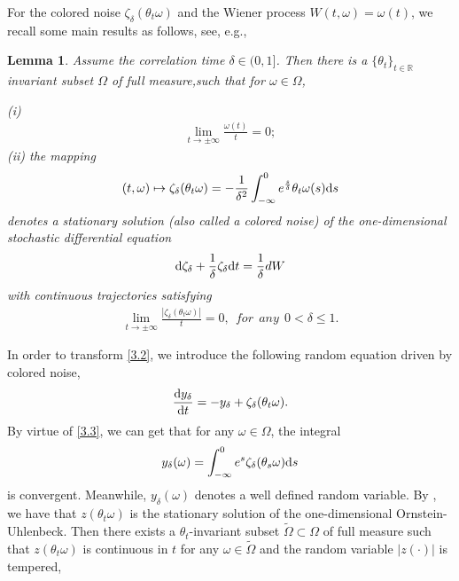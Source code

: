 \documentclass{elsarticle}
\newtheorem{lemma}[theorem]{Lemma}
\theoremstyle{definition}
\numberwithin{equation}{section}
\renewcommand{\d}{{\rm{d}}}
\begin{document}
For the colored noise $\zeta_{\delta}(\theta_t\omega)$ and the Wiener process $W(t,\omega)=\omega(t)$, we recall some main results as follows,  see, e.g., \cite{gu2020,gu2018}
\begin{lemma} \label{lemma3.4}
 Assume the correlation time $\delta\in (0,1]$. Then there is a $\{\theta_t\}_{t\in \mathbb{R}}$ invariant subset $\Omega$ of full measure,such that for $\omega\in\Omega$,

(i)\begin{align*}
\lim\limits_{t\rightarrow\pm\infty}\frac{\omega(t)}{t}=0;
\end{align*}
(ii) the mapping
\begin{align*}
(t,\omega)\mapsto\zeta_{\delta}(\theta_t\omega)=-\frac{1}{\delta^2}\int^0_{-\infty}e^{\frac{s}{\delta}}\theta_t\omega(s)\d s
\end{align*}
denotes a stationary solution (also called  a colored noise) of the one-dimensional stochastic differential equation
\begin{align*}
\d \zeta_{\delta}+\frac{1}{\delta}\zeta_{\delta}\d t= \frac{1}{\delta}dW
\end{align*}
with continuous trajectories satisfying
\begin{align}\label{3.3}
\lim\limits_{t\rightarrow\pm\infty}\frac{|\zeta_{\delta}(\theta_t\omega)|}{t}=0,~~for~~any~~0<\delta\leq1.
\end{align}
\end{lemma}
 In order to transform \eqref{3.2},   we introduce the following random equation driven by colored noise,
  \begin{align}\label{3.8}
\frac{\d y_{\delta}}{\d t}=- y_{\delta}+\zeta_{\delta}(\theta_t\omega).
 \end{align}
By virtue of \eqref{3.3}, we can get that for any $\omega\in\Omega$, the integral
  \begin{align}\label{3.7}
y_{\delta}(\omega)=\int_{-\infty}^0e^{ s}\zeta_{\delta}(\theta_s\omega)\d s
  \end{align}
is convergent. Meanwhile, $y_{\delta}(\omega)$ denotes a well defined random variable. By \cite{crauel97jdde,crauel}, we have that $z(\theta_t\omega)$ is the stationary solution of the one-dimensional Ornstein-Uhlenbeck. Then there exists a $\theta_t $-invariant  subset $\tilde \Omega\subset \Omega$ of full measure such that $z(\theta_t\omega)$ is continuous in $t$  for any $\omega \in \tilde\Omega$ and the random variable $|z(\cdot )|$ is tempered,
\end{document}
